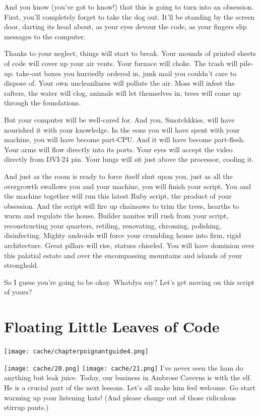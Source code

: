 \documentclass[12pt,twoside]{report}
\begin{document}
And you know (you've got to know!) that this is going to turn into an
obsession.  First, you'll completely forget to take the dog out.
It'll be standing by the screen door, darting its head about, as your
eyes devour the code, as your fingers slip messages to the computer.

Thanks to your neglect, things will start to break.  Your mounds of
printed sheets of code will cover up your air vents.  Your furnace
will choke.  The trash will pile-up: take-out boxes you hurriedly
ordered in, junk mail you couldn't care to dispose of.  Your own
uncleanliness will pollute the air.  Moss will infest the rafters, the
water will clog, animals will let themselves in, trees will come up
through the foundations.

But your computer will be well-cared for.  And you, Smotchkkiss, will
have nourished it with your knowledge. In the eons you will have spent
with your machine, you will have become part-CPU.  And it will have
become part-flesh.  Your arms will flow directly into its ports.  Your
eyes will accept the video directly from DVI-24 pin.  Your lungs will
sit just above the processor, cooling it.

And just as the room is ready to force itself shut upon you, just as
all the overgrowth swallows you and your machine, you will finish your
script.  You and the machine together will run this latest Ruby
script, the product of your obsession.  And the script will fire up
chainsaws to trim the trees, hearths to warm and regulate the house.
Builder nanites will rush from your script, reconstructing your
quarters, retiling, renovating, chroming, polishing, disinfecting.
Mighty androids will force your crumbling house into firm, rigid
architecture.  Great pillars will rise, statues chiseled.  You will
have dominion over this palatial estate and over the encompassing
mountains and islands of your stronghold.

So I guess you're going to be okay.  Whatdya say?  Let's get moving on
this script of yours?
\newpage
\thispagestyle{empty}
\mbox{}

\cleartooddpage


\chapter{Floating Little Leaves of Code}
\vfill
\begin{center}
  \texttt{[image: cache/chapterpoignantguide4.png]}
\end{center}
\vspace{4.6cm}
\newpage
\thispagestyle{empty}
\mbox{}
\clearpage
	\texttt{[image: cache/20.png]}
        \texttt{[image: cache/21.png]}
\clearpage
I've never seen the ham do anything but leak juice.  Today, our
business in Ambrose Caverns is with the elf.  He is a crucial part of
the next lessons. Let's all make him feel welcome. Go start warming up
your listening hats!  (And please change out of those ridiculous
stirrup pants.)
\end{document}
